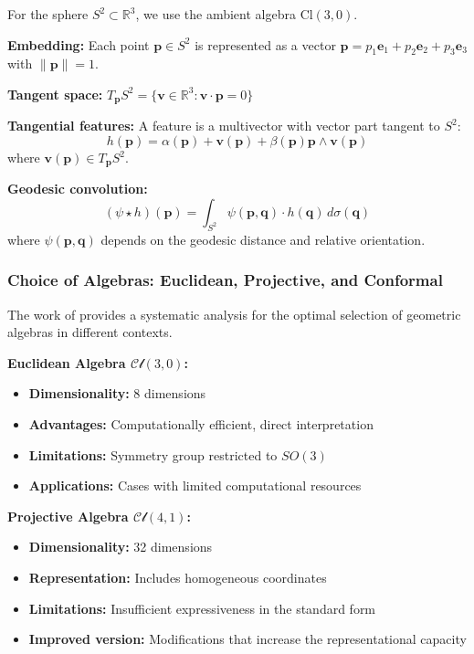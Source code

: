 \begin{example}\label{ex:cnn_sphere_clifford}
For the sphere $S^2 \subset \mathbb{R}^3$, we use the ambient algebra $\text{Cl}(3,0)$.

\textbf{Embedding:}
Each point $\mathbf{p} \in S^2$ is represented as a vector $\mathbf{p} = p_1 \mathbf{e}_1 + p_2 \mathbf{e}_2 + p_3 \mathbf{e}_3$ with $\|\mathbf{p}\| = 1$.

\textbf{Tangent space:}
$T_\mathbf{p} S^2 = \{\mathbf{v} \in \mathbb{R}^3 : \mathbf{v} \cdot \mathbf{p} = 0\}$

\textbf{Tangential features:}
A feature is a multivector with vector part tangent to $S^2$:
\[h(\mathbf{p}) = \alpha(\mathbf{p}) + \mathbf{v}(\mathbf{p}) + \beta(\mathbf{p}) \mathbf{p} \wedge \mathbf{v}(\mathbf{p})\]
where $\mathbf{v}(\mathbf{p}) \in T_\mathbf{p} S^2$.

\textbf{Geodesic convolution:}
\[(\psi \star h)(\mathbf{p}) = \int_{S^2} \psi(\mathbf{p}, \mathbf{q}) \cdot h(\mathbf{q}) \, d\sigma(\mathbf{q})\]
where $\psi(\mathbf{p}, \mathbf{q})$ depends on the geodesic distance and relative orientation.
\end{example}

\subsubsection{Choice of Algebras: Euclidean, Projective, and Conformal}

The work of \citet{dehaan2024euclidean} provides a systematic analysis for the optimal selection of geometric algebras in different contexts.

\textbf{Euclidean Algebra $\mathcal{Cl}(3,0)$:}
\begin{itemize}
    \item \textbf{Dimensionality:} 8 dimensions
    \item \textbf{Advantages:} Computationally efficient, direct interpretation
    \item \textbf{Limitations:} Symmetry group restricted to $SO(3)$
    \item \textbf{Applications:} Cases with limited computational resources
\end{itemize}

\textbf{Projective Algebra $\mathcal{Cl}(4,1)$:}
\begin{itemize}
    \item \textbf{Dimensionality:} 32 dimensions
    \item \textbf{Representation:} Includes homogeneous coordinates
    \item \textbf{Limitations:} Insufficient expressiveness in the standard form
    \item \textbf{Improved version:} Modifications that increase the representational capacity
\end{itemize}

